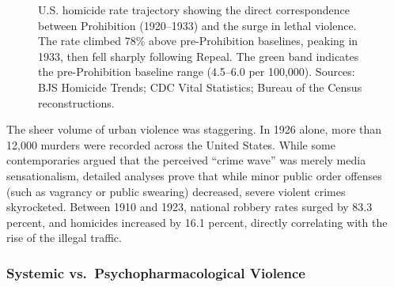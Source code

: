 \documentclass[
]{article}
\begin{document}
\begin{figure}[htbp]
\caption{U.S. homicide rate trajectory showing the direct correspondence between Prohibition (1920--1933) and the surge in lethal violence. The rate climbed 78\% above pre-Prohibition baselines, peaking in 1933, then fell sharply following Repeal. The green band indicates the pre-Prohibition baseline range (4.5--6.0 per 100,000). Sources: BJS Homicide Trends; CDC Vital Statistics; Bureau of the Census reconstructions.}
\label{fig:homicide-rate}
\end{figure}

The sheer volume of urban violence was staggering. In 1926 alone, more
than 12,000 murders were recorded across the United States. While some
contemporaries argued that the perceived ``crime wave'' was merely media
sensationalism, detailed analyses prove that while minor public order
offenses (such as vagrancy or public swearing) decreased, severe violent
crimes skyrocketed. Between 1910 and 1923, national robbery rates surged
by 83.3 percent, and homicides increased by 16.1 percent, directly
correlating with the rise of the illegal traffic.

\subsubsection{\texorpdfstring{\textbf{Systemic
vs.~Psychopharmacological
Violence}}{Systemic vs.~Psychopharmacological Violence}}\label{systemic-vs.-psychopharmacological-violence}
\end{document}
